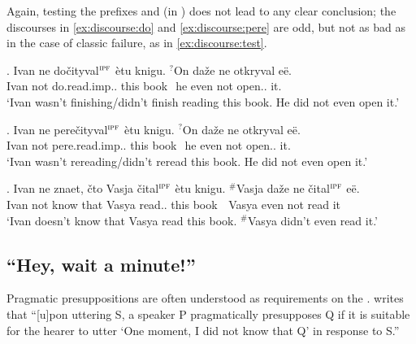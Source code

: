 Again, testing the prefixes  and  (in ) does not lead to any clear conclusion; the discourses in \ref{ex:discourse:do} and \ref{ex:discourse:pere} are odd, but not as bad as in the case of classic  failure, as in \ref{ex:discourse:test}.

\exg. \label{ex:discourse:do}Ivan ne do\v{c}ityval$^{\textsc{ipf}}$ \`{e}tu knigu. $^?$On da\v{z}e ne otkryval e\"{e}.\\
Ivan not do.read.imp.. this book \textcolor{white}{$^?$}he even not open.. it.\\
\trans `Ivan wasn't finishing/didn't finish reading this book. He did not even open it.'

\exg. \label{ex:discourse:pere}Ivan ne pere\v{c}ityval$^{\textsc{ipf}}$ \`{e}tu knigu. $^?$On da\v{z}e ne otkryval e\"{e}.\\
Ivan not pere.read.imp.. this book \textcolor{white}{$^?$}he even not open.. it.\\
\trans `Ivan wasn't rereading/didn't reread this book. He did not even open it.'

\exg. \label{ex:discourse:test}Ivan ne znaet, \v{c}to Vasja \v{c}ital$^{\textsc{ipf}}$ \`{e}tu knigu. $^\#$Vasja da\v{z}e ne \v{c}ital$^{\textsc{ipf}}$ e\"{e}.\\
Ivan not know that Vasya read.. this book \textcolor{white}{$^\#$}Vasya even not read it\\
\trans `Ivan doesn't know that Vasya read this book. $^\#$Vasya didn't even read it.'


\subsection{``Hey, wait a minute!''}
Pragmatic presuppositions are often understood as requirements on the  \citep[see e.g.,][]{Karttunen:73, Stalnaker:73, Shanon:76, Heim:83}. \citet[][248]{Shanon:76} writes that ``[u]pon uttering S, a speaker P pragmatically presupposes Q if it is suitable for the hearer to utter `One moment, I did not know that Q' in response to S.''

